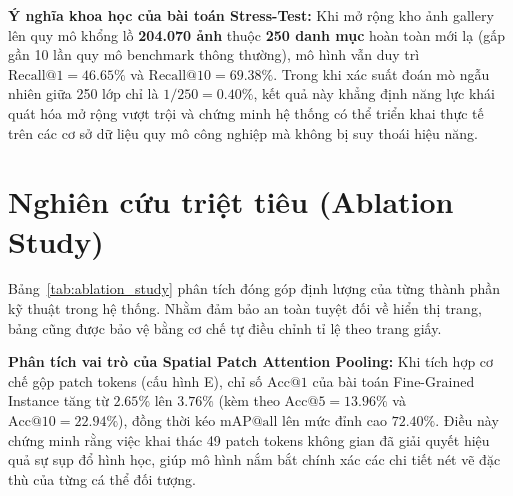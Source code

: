 \documentclass[12pt,a4paper]{report}
\begin{document}
\textbf{Ý nghĩa khoa học của bài toán Stress-Test:}
Khi mở rộng kho ảnh gallery lên quy mô khổng lồ \textbf{204.070 ảnh} thuộc \textbf{250 danh mục} hoàn toàn mới lạ (gấp gần 10 lần quy mô benchmark thông thường), mô hình vẫn duy trì $\text{Recall@1} = \mathbf{46.65\%}$ và $\text{Recall@10} = \mathbf{69.38\%}$. Trong khi xác suất đoán mò ngẫu nhiên giữa 250 lớp chỉ là $1/250 = 0.40\%$, kết quả này khẳng định năng lực khái quát hóa mở rộng vượt trội và chứng minh hệ thống có thể triển khai thực tế trên các cơ sở dữ liệu quy mô công nghiệp mà không bị suy thoái hiệu năng.

\section{Nghiên cứu triệt tiêu (Ablation Study)}
Bảng~\ref{tab:ablation_study} phân tích đóng góp định lượng của từng thành phần kỹ thuật trong hệ thống. Nhằm đảm bảo an toàn tuyệt đối về hiển thị trang, bảng cũng được bảo vệ bằng cơ chế tự điều chỉnh tỉ lệ theo trang giấy.

\begin{table}[H]
    \centering
    \caption{Nghiên cứu triệt tiêu các thành phần kỹ thuật trên tập Sketchy Unseen.}
    \label{tab:ablation_study}
    \small
    \setlength{\tabcolsep}{6pt}
\end{table}

\textbf{Phân tích vai trò của Spatial Patch Attention Pooling:} Khi tích hợp cơ chế gộp patch tokens (cấu hình E), chỉ số $\text{Acc@1}$ của bài toán Fine-Grained Instance tăng từ $2.65\%$ lên \textbf{$3.76\%$} (kèm theo $\text{Acc@5} = 13.96\%$ và $\text{Acc@10} = 22.94\%$), đồng thời kéo $\text{mAP@all}$ lên mức đỉnh cao \textbf{$72.40\%$}. Điều này chứng minh rằng việc khai thác 49 patch tokens không gian đã giải quyết hiệu quả sự sụp đổ hình học, giúp mô hình nắm bắt chính xác các chi tiết nét vẽ đặc thù của từng cá thể đối tượng.
\end{document}
